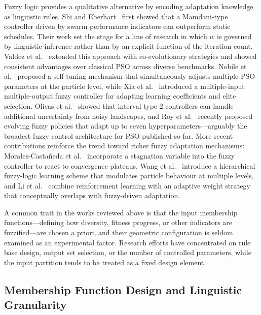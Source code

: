 \documentclass[conference]{IEEEtran}
\newcommand{\new}[1]{{\color{red}#1}}
\begin{document}
Fuzzy logic provides a qualitative alternative by encoding adaptation knowledge as linguistic rules. Shi and Eberhart~\cite{shi2001fuzzy} first showed that a Mamdani-type controller driven by swarm performance indicators can outperform static schedules. Their work set the stage for a line of research in which $w$ is governed by linguistic inference rather than by an explicit function of the iteration count. Valdez et al.~\cite{valdez2017comparative} extended this approach with co-evolutionary strategies and showed consistent advantages over classical PSO across diverse benchmarks. Nobile et al.~\cite{nobile2018fuzzy} proposed a self-tuning mechanism that simultaneously adjusts multiple PSO parameters at the particle level, while Xia et al.~\cite{xia2022particle} introduced a multiple-input multiple-output fuzzy controller for adapting learning coefficients and elite selection. Olivas et al.~\cite{olivas2014comparative} showed that interval type-2 controllers can handle additional uncertainty from noisy landscapes, and Roy et al.~\cite{roy2024hyperparameter} recently proposed evolving fuzzy policies that adapt up to seven hyperparameters---arguably the broadest fuzzy control architecture for PSO published so far. %
\new{More recent contributions reinforce the trend toward richer fuzzy adaptation mechanisms: Morales-Casta\~neda et al.~\cite{morales2023stagnation} incorporate a stagnation variable into the fuzzy controller to react to convergence plateaus, Wang et al.~\cite{wang2023hierarchical} introduce a hierarchical fuzzy-logic learning scheme that modulates particle behaviour at multiple levels, and Li et al.~\cite{li2025rapso} combine reinforcement learning with an adaptive weight strategy that conceptually overlaps with fuzzy-driven adaptation.}

A common trait in the works reviewed above is that the input membership functions---defining how diversity, fitness progress, or other indicators are fuzzified---are chosen a priori, and their geometric configuration is seldom examined as an experimental factor. Research efforts have concentrated on rule base design, output set selection, or the number of controlled parameters, while the input partition tends to be treated as a fixed design element.

\subsection{Membership Function Design and Linguistic Granularity}
\label{subsec:rw_mf_design}
\end{document}
